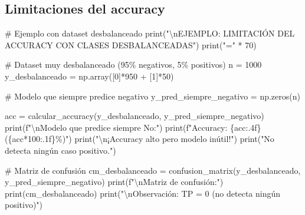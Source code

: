 \documentclass[
  doc,
  floatsintext,
  longtable,
  a4paper,
  nolmodern,
  notxfonts,
  notimes,
  12pt,
  colorlinks=true,linkcolor=blue,citecolor=blue,urlcolor=blue]{apa7}
\newenvironment{Shaded}{\begin{snugshade}}{\end{snugshade}}
\newcommand{\BuiltInTok}[1]{\textcolor[rgb]{0.00,0.23,0.31}{#1}}
\newcommand{\CharTok}[1]{\textcolor[rgb]{0.13,0.47,0.30}{#1}}
\newcommand{\CommentTok}[1]{\textcolor[rgb]{0.37,0.37,0.37}{#1}}
\newcommand{\DecValTok}[1]{\textcolor[rgb]{0.68,0.00,0.00}{#1}}
\newcommand{\NormalTok}[1]{\textcolor[rgb]{0.00,0.23,0.31}{#1}}
\newcommand{\OperatorTok}[1]{\textcolor[rgb]{0.37,0.37,0.37}{#1}}
\newcommand{\SpecialCharTok}[1]{\textcolor[rgb]{0.37,0.37,0.37}{#1}}
\newcommand{\SpecialStringTok}[1]{\textcolor[rgb]{0.13,0.47,0.30}{#1}}
\newcommand{\StringTok}[1]{\textcolor[rgb]{0.13,0.47,0.30}{#1}}
\begin{document}
\subsection{Limitaciones del accuracy}\label{limitaciones-del-accuracy}

\begin{Shaded}
\begin{Highlighting}[]
\CommentTok{\# Ejemplo con dataset desbalanceado}
\BuiltInTok{print}\NormalTok{(}\StringTok{"}\CharTok{\textbackslash{}n}\StringTok{EJEMPLO: LIMITACIÓN DEL ACCURACY CON CLASES DESBALANCEADAS"}\NormalTok{)}
\BuiltInTok{print}\NormalTok{(}\StringTok{"="} \OperatorTok{*} \DecValTok{70}\NormalTok{)}

\CommentTok{\# Dataset muy desbalanceado (95\% negativos, 5\% positivos)}
\NormalTok{n }\OperatorTok{=} \DecValTok{1000}
\NormalTok{y\_desbalanceado }\OperatorTok{=}\NormalTok{ np.array([}\DecValTok{0}\NormalTok{]}\OperatorTok{*}\DecValTok{950} \OperatorTok{+}\NormalTok{ [}\DecValTok{1}\NormalTok{]}\OperatorTok{*}\DecValTok{50}\NormalTok{)}

\CommentTok{\# Modelo que siempre predice negativo}
\NormalTok{y\_pred\_siempre\_negativo }\OperatorTok{=}\NormalTok{ np.zeros(n)}

\NormalTok{acc }\OperatorTok{=}\NormalTok{ calcular\_accuracy(y\_desbalanceado, y\_pred\_siempre\_negativo)}
\BuiltInTok{print}\NormalTok{(}\SpecialStringTok{f"}\CharTok{\textbackslash{}n}\SpecialStringTok{Modelo que predice siempre \textquotesingle{}No\textquotesingle{}:"}\NormalTok{)}
\BuiltInTok{print}\NormalTok{(}\SpecialStringTok{f"Accuracy: }\SpecialCharTok{\{}\NormalTok{acc}\SpecialCharTok{:.4f\}}\SpecialStringTok{ (}\SpecialCharTok{\{}\NormalTok{acc}\OperatorTok{*}\DecValTok{100}\SpecialCharTok{:.1f\}}\SpecialStringTok{\%)"}\NormalTok{)}
\BuiltInTok{print}\NormalTok{(}\StringTok{"}\CharTok{\textbackslash{}n}\StringTok{¡Accuracy alto pero modelo inútil!"}\NormalTok{)}
\BuiltInTok{print}\NormalTok{(}\StringTok{"No detecta ningún caso positivo."}\NormalTok{)}

\CommentTok{\# Matriz de confusión}
\NormalTok{cm\_desbalanceado }\OperatorTok{=}\NormalTok{ confusion\_matrix(y\_desbalanceado, y\_pred\_siempre\_negativo)}
\BuiltInTok{print}\NormalTok{(}\SpecialStringTok{f"}\CharTok{\textbackslash{}n}\SpecialStringTok{Matriz de confusión:"}\NormalTok{)}
\BuiltInTok{print}\NormalTok{(cm\_desbalanceado)}
\BuiltInTok{print}\NormalTok{(}\StringTok{"}\CharTok{\textbackslash{}n}\StringTok{Observación: TP = 0 (no detecta ningún positivo)"}\NormalTok{)}
\end{Highlighting}
\end{Shaded}
\end{document}
